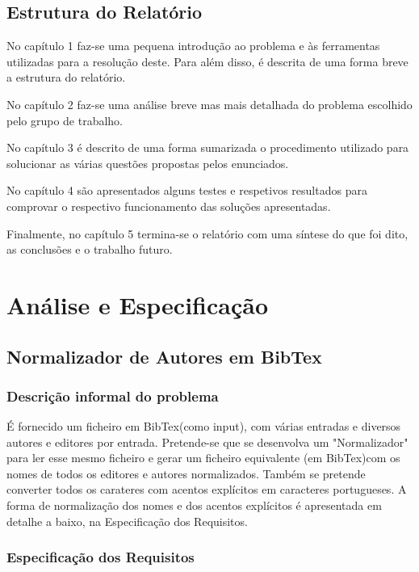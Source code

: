 \documentclass{report}
\begin{document}
\section*{Estrutura do Relatório}
No capítulo 1 faz-se uma pequena introdução ao problema e às ferramentas utilizadas para a resolução deste. Para além disso, é descrita de uma forma breve a estrutura do relatório.\par
No capítulo 2 faz-se uma análise breve mas mais detalhada do problema escolhido pelo grupo de trabalho.\par
No capítulo 3 é descrito de uma forma sumarizada o procedimento utilizado para solucionar as várias questões propostas pelos enunciados.\par
No capítulo 4 são apresentados alguns testes e respetivos resultados para comprovar o respectivo funcionamento das soluções apresentadas.\par
Finalmente, no capítulo 5 termina-se o relatório com uma síntese do que foi dito, as conclusões e o trabalho futuro.

\chapter{Análise e Especificação} \label{ae}

\section{Normalizador de Autores em BibTex}

\subsection{Descrição informal do problema}
É fornecido um ficheiro em BibTex(como input), com várias entradas e diversos autores e editores por entrada.
Pretende-se que se desenvolva um "Normalizador" para ler esse mesmo ficheiro e gerar um ficheiro equivalente
(em BibTex)com os nomes de todos os editores e autores normalizados. Também se pretende converter todos os carateres com acentos explícitos em caracteres portugueses.
A forma de normalização dos nomes e dos acentos explícitos é apresentada em detalhe a baixo, na Especificação dos Requisitos.
\subsection{Especificação dos Requisitos}
\end{document}
